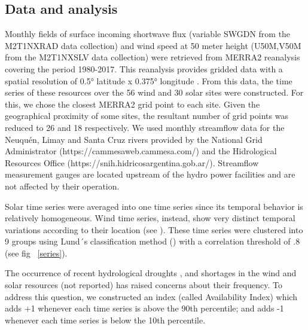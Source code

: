 \documentclass[AMA,Times1COL]{WileyNJDv5} %
\begin{document}
\begin{linenumbers}
\subsection{Data and analysis}

Monthly fields of surface incoming shortwave flux (variable SWGDN from the M2T1NXRAD data collection) and wind speed at 50 meter height (U50M,V50M from the M2T1NXSLV data collection) were retrieved from MERRA2 reanalysis \cite{gelaro2017modern} covering the period 1980-2017. This reanalysis provides gridded data with a spatial resolution of 0.5° latitude x 0.375° longitude \cite{bosilovich2015merra}. From this data, the time series of these resources over the 56 wind and 30 solar sites were constructed. For this, we chose the closest MERRA2 grid point to each site. Given the geographical proximity of some sites, the resultant number of grid points was reduced to 26 and 18 respectively. We used monthly streamflow data for the Neuquén, Limay and Santa Cruz rivers provided by the National Grid Administrator (https://cammesaweb.cammesa.com/) and the Hidrological Resources Office (https://snih.hidricosargentina.gob.ar/). Streamflow measurement gauges are located upstream of the hydro power facilities and are not affected by their operation.

Solar time series were averaged into one time series since its temporal behavior is relatively homogeneous. Wind time series, instead, show very distinct temporal variations according to their location (see \cite{bianchi2019spatiotemporal}). These time series were clustered into 9 groups using Lund´s classification method (\cite{lund1963map}) with a correlation threshold of .8 (see fig ~\ref{series}).

The occurrence of recent hydrological droughts \cite{aguayo2021hydrological}, and shortages in the wind and solar resources (not reported) has raised concerns about their frequency. To address this question, we constructed an index (called Availability Index) which adds +1 whenever each time series is above the 90th percentile; and adds -1 whenever each time series is below the 10th percentile. 


\end{linenumbers}
\end{document}

